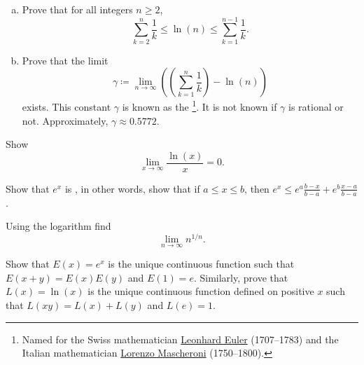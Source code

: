\begin{samepage}
\begin{exercise}
\leavevmode
\begin{enumerate}[a)]
\item
Prove that for all integers $n \geq 2$,
\begin{equation*}
\sum_{k=2}^{n}
\frac{1}{k}
\leq
\ln (n)
\leq
\sum_{k=1}^{n-1}
\frac{1}{k} .
\end{equation*}
\item
Prove that the limit
\begin{equation*}
\gamma \coloneqq \lim_{n\to\infty}
\left( \left( \sum_{k=1}^{n} \frac{1}{k} \right) - \ln (n) \right)
\end{equation*}
exists.  This constant $\gamma$ is known as the
\emph{}%
\footnote{Named for the Swiss mathematician
\href{https://en.wikipedia.org/wiki/Leonhard_Euler}{Leonhard Euler}
(1707--1783)
and the Italian mathematician
\href{https://en.wikipedia.org/wiki/Lorenzo_Mascheroni}{Lorenzo Mascheroni}
(1750--1800).}.  It is not known if $\gamma$ is rational or not.
Approximately, $\gamma \approx 0.5772$.
\end{enumerate}
\end{exercise}
\end{samepage}

\begin{exercise}
Show
\begin{equation*}
\lim_{x\to\infty} \frac{\ln(x)}{x} = 0 .
\end{equation*}
\end{exercise}

\begin{exercise}
Show that $e^x$ is \emph{}, in other words, show that 
if $a \leq x \leq b$, then
$e^x \leq e^a \frac{b-x}{b-a} + e^b \frac{x-a}{b-a}$.
\end{exercise}

\begin{exercise}
Using the logarithm find
\begin{equation*}
\lim_{n\to\infty} n^{1/n} .
\end{equation*}
\end{exercise}

\begin{exercise}
Show that $E(x) = e^x$ is the unique continuous function such that
$E(x+y) = E(x)E(y)$ and $E(1) = e$.   Similarly, prove that $L(x) = \ln(x)$
is the unique continuous
function defined on positive $x$ such that $L(xy) = L(x)+L(y)$
and $L(e) = 1$.
\end{exercise}

